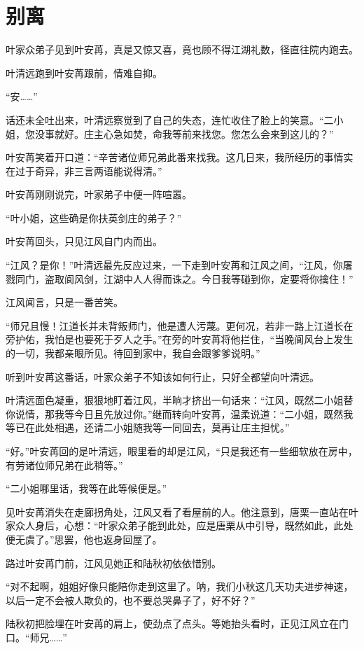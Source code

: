 \chapter{别离}
叶家众弟子见到叶安苒，真是又惊又喜，竟也顾不得江湖礼数，径直往院内跑去。

叶清远跑到叶安苒跟前，情难自抑。

“安……”

话还未全吐出来，叶清远察觉到了自己的失态，连忙收住了脸上的笑意。“二小姐，您没事就好。庄主心急如焚，命我等前来找您。您怎么会来到这儿的？”

叶安苒笑着开口道：“辛苦诸位师兄弟此番来找我。这几日来，我所经历的事情实在过于奇异，非三言两语能说得清。”

叶安苒刚刚说完，叶家弟子中便一阵喧嚣。

“叶小姐，这些确是你扶英剑庄的弟子？”

叶安苒回头，只见江风自门内而出。

“江风？是你！”叶清远最先反应过来，一下走到叶安苒和江风之间，“江风，你屠戮同门，盗取阆风剑，江湖中人人得而诛之。今日我等碰到你，定要将你擒住！”

江风闻言，只是一番苦笑。

“师兄且慢！江道长并未背叛师门，他是遭人污蔑。更何况，若非一路上江道长在旁护佑，我怕是也要死于歹人之手。”在旁的叶安苒将他拦住，“当晚阆风台上发生的一切，我都亲眼所见。待回到家中，我自会跟爹爹说明。”

听到叶安苒这番话，叶家众弟子不知该如何行止，只好全都望向叶清远。

叶清远面色凝重，狠狠地盯着江风，半晌才挤出一句话来：“江风，既然二小姐替你说情，那我等今日且先放过你。”继而转向叶安苒，温柔说道：“二小姐，既然我等已在此处相遇，还请二小姐随我等一同回去，莫再让庄主担忧。”

“好。”叶安苒回的是叶清远，眼里看的却是江风，“只是我还有一些细软放在房中，有劳诸位师兄弟在此稍等。”

“二小姐哪里话，我等在此等候便是。”

见叶安苒消失在走廊拐角处，江风又看了看屋前的人。他注意到，唐栗一直站在叶家众人身后，心想：“叶家众弟子能到此处，应是唐栗从中引导，既然如此，此处便无虞了。”思罢，他也返身回屋了。

路过叶安苒门前，江风见她正和陆秋初依依惜别。

“对不起啊，姐姐好像只能陪你走到这里了。呐，我们小秋这几天功夫进步神速，以后一定不会被人欺负的，也不要总哭鼻子了，好不好？”

陆秋初把脸埋在叶安苒的肩上，使劲点了点头。等她抬头看时，正见江风立在门口。“师兄……”

